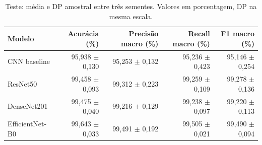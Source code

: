 \begin{table}[htbp]
\centering
\caption{Teste: média e DP amostral entre três sementes. Valores em porcentagem, DP na mesma escala.}
\label{tab:test-macro}
\small
\begin{tabular}{lrrrr}
\toprule
Modelo & Acurácia (\%) & Precisão macro (\%) & Recall macro (\%) & F1 macro (\%) \\
\midrule
CNN baseline & 95,938 $\pm$ 0,130 & 95,253 $\pm$ 0,132 & 95,236 $\pm$ 0,423 & 95,146 $\pm$ 0,254 \\
ResNet50 & 99,458 $\pm$ 0,093 & 99,312 $\pm$ 0,223 & 99,259 $\pm$ 0,109 & 99,278 $\pm$ 0,136 \\
DenseNet201 & 99,475 $\pm$ 0,040 & 99,216 $\pm$ 0,129 & 99,238 $\pm$ 0,097 & 99,220 $\pm$ 0,113 \\
EfficientNet-B0 & 99,643 $\pm$ 0,033 & 99,491 $\pm$ 0,192 & 99,505 $\pm$ 0,021 & 99,490 $\pm$ 0,094 \\
\bottomrule
\end{tabular}
\end{table}

